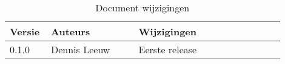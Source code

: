 \begin{flushleft}
\begin{table}[h!]
\centering
	\begin{tabularx}{\textwidth}{ |p{0.1\linewidth}|p{0.3\linewidth}|p{0.5\linewidth}| }
\hline
	Versie &
	Auteurs &
	Wijzigingen\\
\hline
	0.1.0 &
	Dennis Leeuw &
	Eerste release\\
\hline
\hline
\end{tabularx}
\caption{Document wijzigingen}
\label{table:1}
\end{table}
\end{flushleft}

